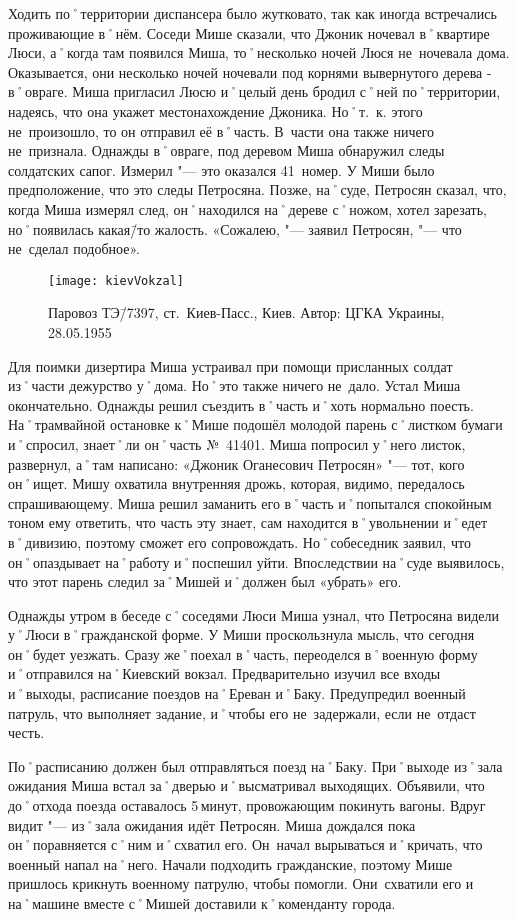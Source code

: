 Ходить по˚территории диспансера было жутковато, так как иногда встречались проживающие в˚нём. Соседи Мише сказали, что Джоник ночевал в˚квартире Люси, а˚когда там появился Миша, то˚несколько ночей Люся не~ночевала дома. Оказывается, они несколько ночей ночевали под корнями вывернутого дерева - в˚овраге. Миша пригласил Люсю и˚целый день бродил с˚ней по˚территории, надеясь, что она укажет местонахождение Джоника. Но˚т.~к. этого не~произошло, то он отправил её в˚часть. В~части она также ничего не~признала. Однажды в˚овраге, под деревом Миша обнаружил следы солдатских сапог. Измерил "--- это оказался 41~номер. У Миши  было предположение, что это следы Петросяна. Позже, на˚суде, Петросян сказал, что, когда Миша измерял след, он˚находился на˚дереве с˚ножом, хотел зарезать, но˚появилась какая\=/то жалость. «Сожалею, "--- заявил Петросян, "--- что не~сделал подобное».  

\begin{wrapfigure}{O}{.4\textwidth}
\centering
\texttt{[image: kievVokzal]}
\caption{Паровоз ТЭ\=/7397, ст.~Киев-Пасс., Киев. Автор: ЦГКА Украины, 28.05.1955}
\label{fig:kievVokzal}
\end{wrapfigure}

Для поимки дизертира Миша устраивал при помощи присланных солдат из˚части дежурство у˚дома. Но˚это также ничего не~дало. Устал Миша окончательно. Однажды решил съездить в˚часть и˚хоть нормально поесть. На˚трамвайной остановке к˚Мише подошёл молодой парень с˚листком бумаги и˚спросил, знает˚ли он˚часть №~41401. Миша попросил у˚него листок, развернул, а˚там написано: «Джоник Оганесович Петросян» "--- тот, кого он˚ищет. Мишу охватила внутренняя дрожь, которая, видимо, передалось спрашивающему. Миша решил заманить его в˚часть и˚попытался спокойным тоном ему ответить, что часть эту знает, сам находится в˚увольнении и˚едет в˚дивизию, поэтому сможет его сопровождать.  Но˚собеседник заявил, что он˚опаздывает на˚работу и˚поспешил уйти. Впоследствии на˚суде выявилось, что этот парень следил за˚Мишей и˚должен был «убрать» его.

Однажды утром в беседе с˚соседями Люси Миша узнал, что Петросяна видели у˚Люси в˚гражданской форме. У Миши проскользнула мысль, что сегодня он˚будет уезжать. Сразу же˚поехал в˚часть, переоделся в˚военную форму и˚отправился на˚Киевский вокзал. Предварительно изучил все входы и˚выходы, расписание поездов на˚Ереван и˚Баку. Предупредил военный патруль, что выполняет задание, и˚чтобы его не~задержали, если не~отдаст честь. 

По˚расписанию должен был отправляться поезд на˚Баку. При˚выходе из˚зала ожидания Миша встал за˚дверью и˚высматривал выходящих. Объявили, что до˚отхода поезда оставалось 5\,минут, провожающим покинуть вагоны. Вдруг видит "--- из˚зала ожидания идёт Петросян. Миша дождался пока он˚поравняется с˚ним и˚схватил его. Он~начал вырываться и˚кричать, что военный напал на˚него. Начали подходить гражданские, поэтому Мише пришлось крикнуть военному патрулю, чтобы помогли. Они~схватили его и на˚машине вместе с˚Мишей доставили к˚коменданту города. 

